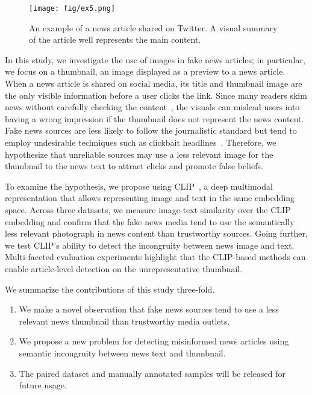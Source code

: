 \documentclass[11pt]{article}
\begin{document}
\begin{figure}
    \centering
    \texttt{[image: fig/ex5.png]}
    \caption{An example of a news article shared on Twitter. A visual summary of the article well represents the main content.}
    \label{fig:my_label}
\end{figure}

In this study, we investigate the use of images in fake news articles; in particular, we focus on a thumbnail, an image displayed as a preview to a news article. When a news article is shared on social media, its title and thumbnail image are the only visible information before a user clicks the link. Since many readers skim news without carefully checking the content~\cite{10.1145/2896377.2901462}, the visuals can mislead users into having a wrong impression if the thumbnail does not represent the news content. Fake news sources are less likely to follow the journalistic standard but tend to employ undesirable techniques such as clickbait headlines~\cite{10.1145/2823465.2823467}. Therefore, we hypothesize that unreliable sources may use a less relevant image for the thumbnail to the news text to attract clicks and promote false beliefs.

To examine the hypothesis, we propose using CLIP~\cite{radford2021learning}, a deep multimodal representation that allows representing image and text in the same embedding space. Across three datasets, we measure image-text similarity over the CLIP embedding and confirm that the fake news media tend to use the semantically less relevant photograph in news content than trustworthy sources. Going further, we test CLIP's ability to detect the incongruity between news image and text. Multi-faceted evaluation experiments highlight that the CLIP-based methods can enable article-level detection on the unrepresentative thumbnail.

We summarize the contributions of this study three-fold.

\begin{enumerate}

    \item We make a novel observation that fake news sources tend to use a less relevant news thumbnail than trustworthy media outlets.

    \item We propose a new problem for detecting misinformed news articles using semantic incongruity between news text and thumbnail.
    
    \item The paired dataset and manually annotated samples will be released for future usage.

\end{enumerate}
\end{document}
